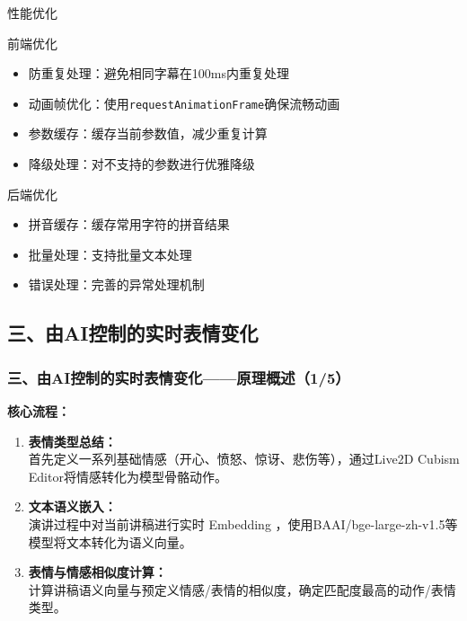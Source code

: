 \documentclass{beamer}
\begin{document}
\begin{frame}{性能优化}
    \begin{block}{前端优化}
        \begin{itemize}
            \item 防重复处理：避免相同字幕在100ms内重复处理
            \item 动画帧优化：使用\texttt{requestAnimationFrame}确保流畅动画
            \item 参数缓存：缓存当前参数值，减少重复计算
            \item 降级处理：对不支持的参数进行优雅降级
        \end{itemize}
    \end{block}

    \begin{block}{后端优化}
        \begin{itemize}
            \item 拼音缓存：缓存常用字符的拼音结果
            \item 批量处理：支持批量文本处理
            \item 错误处理：完善的异常处理机制
        \end{itemize}
    \end{block}
\end{frame}

\subsection{三、由AI控制的实时表情变化}
\begin{frame}
    \frametitle{三、由AI控制的实时表情变化——原理概述（1/5）}
    \textbf{核心流程：}
    \begin{enumerate}
        \item \textbf{表情类型总结：} \\ 首先定义一系列基础情感（开心、愤怒、惊讶、悲伤等），通过Live2D Cubism Editor将情感转化为模型骨骼动作。
        \item \textbf{文本语义嵌入：} \\ 演讲过程中对当前讲稿进行实时 Embedding ，使用BAAI/bge-large-zh-v1.5等模型将文本转化为语义向量。
        \item \textbf{表情与情感相似度计算：} \\
              计算讲稿语义向量与预定义情感/表情的相似度，确定匹配度最高的动作/表情类型。
    \end{enumerate}
\end{frame}
\end{document}
